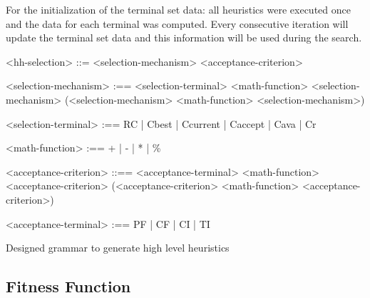 \documentclass[conference]{IEEEtran}
\begin{document}

 For the initialization of the terminal set data: all heuristics were executed once and the data for each terminal was computed. Every consecutive iteration will update the terminal set data and this information will be used during the search.
 

 \begin{Grammar}
 	\begin{grammar}
 		<hh-selection> ::= <selection-mechanism> <acceptance-criterion> 
 		
 		<selection-mechanism> :==  <selection-terminal>   
 		\alt <selection-mechanism> <math-function> <selection-mechanism> 
 		\alt (<selection-mechanism> <math-function> <selection-mechanism>) 
 		
 		<selection-terminal> :== 
 		RC 
 		| Cbest 
 		| Ccurrent 
 		| Caccept 
 		| Cava 
 		| Cr
 		
 		<math-function> :== + 
 		| - 
 		| * 
 		| \%
 		
 		<acceptance-criterion> ::== <acceptance-terminal> 
 		\alt <acceptance-criterion> <math-function>
 		<acceptance-criterion>
 		\alt (<acceptance-criterion>  <math-function> <acceptance-criterion>) 
 		
 		<acceptance-terminal> :== PF | CF | CI | TI
 		
 		
 		
 	\end{grammar}
 	\caption{Designed grammar to generate high level heuristics}
 	\label{grammar:proposedGrammar}
 \end{Grammar}

%
\subsection{Fitness Function}
\label{subsection:fitnessFunction}
\end{document}
